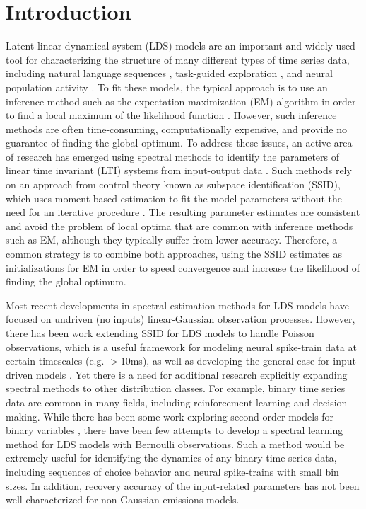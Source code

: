 \section{Introduction}
\label{sec:bestlds:intro}

Latent linear dynamical system (LDS) models are an important and widely-used tool for characterizing the structure of many different types of time series data, including natural language sequences \cite{belanger_linear_2015}, task-guided exploration \cite{wagenmaker_experimental_2021}, and neural population activity \cite{gao_high-dimensional_2015,nonnenmacher_extracting_2017, zoltowski_general_2020}. To fit these models, the typical approach is to use an inference method such as the expectation maximization (EM) algorithm in order to find a local maximum of the likelihood function \cite{escola_hidden_2011}. However, such inference methods are often time-consuming, computationally expensive, and provide no guarantee of finding the global optimum. To address these issues, an active area of research has emerged using spectral methods to identify the parameters of linear time invariant (LTI) systems from input-output data \cite{martens_learning_2010, anandkumar_tensor_2014, belanger_linear_2015, hazan_learning_2017,hazan_spectral_2018}. Such methods rely on an approach from control theory known as subspace identification (SSID), which uses moment-based estimation to fit the model parameters without the need for an iterative procedure \cite{ho_editorial_1966,van_overschee_n4sid_1994,viberg_subspace-based_1995,van_overschee_subspace_1996,qin_overview_2006}. The resulting parameter estimates are consistent and avoid the problem of local optima that are common with inference methods such as EM, although they typically suffer from lower accuracy. Therefore, a common strategy is to combine both approaches, using the SSID estimates as initializations for EM in order to speed convergence and increase the likelihood of finding the global optimum. 

Most recent developments in spectral estimation methods for LDS models have focused on undriven (no inputs) linear-Gaussian observation processes. However, there has been work extending SSID for LDS models to handle Poisson observations, which is a useful framework for modeling neural spike-train data at certain timescales (e.g. $>10$ms), as well as developing the general case for input-driven models \cite{buesing_spectral_2012}. Yet there is a need for additional research explicitly expanding spectral methods to other distribution classes. For example, binary time series data are common in many fields, including reinforcement learning and decision-making. While there has been some work exploring second-order models for binary variables \cite{bethge_near-maximum_2008, macke_generating_2009, schein_poisson-gamma_2016}, there have been few attempts to develop a spectral learning method for LDS models with Bernoulli observations. Such a method would be extremely useful for identifying the dynamics of any binary time series data, including sequences of choice behavior and neural spike-trains with small bin sizes. In addition, recovery accuracy of the input-related parameters has not been well-characterized for non-Gaussian emissions models.

